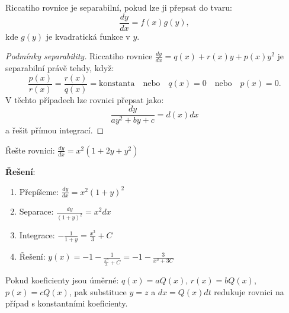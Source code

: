 \vspace{0.8\baselineskip}

\begin{method}
\label{met:separabilni-riccati}
Riccatiho rovnice je separabilní, pokud lze ji přepsat do tvaru:
\[
\frac{dy}{dx} = f(x)g(y),
\]
kde $g(y)$ je kvadratická funkce v $y$.
\end{method}

\vspace{0.6\baselineskip}

\begin{proof}[Podmínky separability]
Riccatiho rovnice $\frac{dy}{dx} = q(x) + r(x)y + p(x)y^2$ je separabilní právě tehdy, když:
\[
\frac{p(x)}{r(x)} = \frac{r(x)}{q(x)} = \text{konstanta} \quad \text{nebo} \quad q(x) = 0 \quad \text{nebo} \quad p(x) = 0.
\]
V těchto případech lze rovnici přepsat jako:
\[
\frac{dy}{a y^2 + b y + c} = d(x) dx
\]
a řešit přímou integrací.
\end{proof}

\vspace{0.6\baselineskip}

\begin{example}
\label{ex:separabilni-riccati}
Řešte rovnici: $\frac{dy}{dx} = x^2(1 + 2y + y^2)$

\textbf{Řešení}:
\begin{enumerate}
\item Přepíšeme: $\frac{dy}{dx} = x^2(1 + y)^2$
\item Separace: $\frac{dy}{(1 + y)^2} = x^2 dx$
\item Integrace: $-\frac{1}{1 + y} = \frac{x^3}{3} + C$
\item Řešení: $y(x) = -1 - \frac{1}{\frac{x^3}{3} + C} = -1 - \frac{3}{x^3 + 3C}$
\end{enumerate}
\end{example}

\vspace{0.8\baselineskip}

\begin{method}
\label{met:proporcni-koeficienty}
Pokud koeficienty jsou úměrné: $q(x) = a Q(x)$, $r(x) = b Q(x)$, $p(x) = c Q(x)$, pak
substituce $y = z$ a $dx = Q(x) dt$ redukuje rovnici na případ s konstantními koeficienty.
\end{method}

\vspace{0.6\baselineskip}

